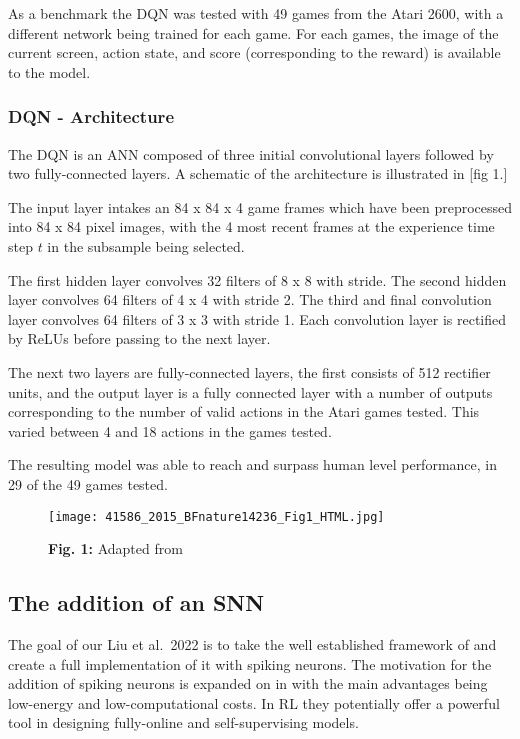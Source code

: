 \documentclass[
]{article}
\begin{document}
As a benchmark the DQN was tested with 49 games from the Atari 2600,
with a different network being trained for each game. For each games,
the image of the current screen, action state, and score (corresponding
to the reward) is available to the model.

\hypertarget{dqn---architecture}{%
\subsubsection{DQN - Architecture}\label{dqn---architecture}}

The DQN is an ANN composed of three initial convolutional layers
followed by two fully-connected layers. A schematic of the architecture
is illustrated in {[}fig 1.{]}

The input layer intakes an 84 x 84 x 4 game frames which have been
preprocessed into 84 x 84 pixel images, with the 4 most recent frames at
the experience time step \(t\) in the subsample being selected.

The first hidden layer convolves 32 filters of 8 x 8 with stride. The
second hidden layer convolves 64 filters of 4 x 4 with stride 2. The
third and final convolution layer convolves 64 filters of 3 x 3 with
stride 1. Each convolution layer is rectified by ReLUs before passing to
the next layer.

The next two layers are fully-connected layers, the first consists of
512 rectifier units, and the output layer is a fully connected layer
with a number of outputs corresponding to the number of valid actions in
the Atari games tested. This varied between 4 and 18 actions in the
games tested.

The resulting model was able to reach and surpass human level
performance, in 29 of the 49 games tested.

\begin{figure}
\centering
\texttt{[image: 41586\_2015\_BFnature14236\_Fig1\_HTML.jpg]}
\caption{\textbf{Fig. 1:} Adapted from
\autocite{mnihHumanlevelControlDeep2015}}
\end{figure}

\hypertarget{the-addition-of-an-snn}{%
\subsection{The addition of an SNN}\label{the-addition-of-an-snn}}

The goal of our Liu et al.~2022 is to take the well established
framework of \autocite{mnihHumanlevelControlDeep2015} and create a
full implementation of it with spiking neurons. The motivation for the
addition of spiking neurons is expanded on in
\autocite{zenkeVisualizingJointFuture2021}
\autocite{princeCurrentStateFuture2022}
\autocite{mehonicBraininspiredComputingNeeds2022} with the main
advantages being low-energy and low-computational costs. In RL they
potentially offer a powerful tool in designing fully-online and
self-supervising models.
\end{document}
